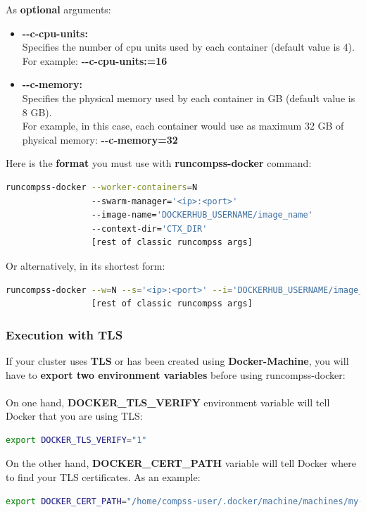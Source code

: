 As \textbf{optional} arguments:
\begin{itemize}
 \item { 
 \textbf{-{}-c-cpu-units:} \\
 Specifies the number of cpu units used by each container (default value is 4). \\
 For example: \textbf{-{}-c-cpu-units:=16}
 }
 
 \item { 
 \textbf{-{}-c-memory:} \\
 Specifies the physical memory used by each container in GB (default value is 8 GB).\\
 For example, in this case, each container would use as maximum 32 GB of physical memory: \textbf{-{}-c-memory=32}
 }
\end{itemize}

Here is the \textbf{format} you must use with \textbf{runcompss-docker} command:
\begin{lstlisting}[language=bash]
runcompss-docker --worker-containers=N
                 --swarm-manager='<ip>:<port>'
                 --image-name='DOCKERHUB_USERNAME/image_name'
                 --context-dir='CTX_DIR'
                 [rest of classic runcompss args]
\end{lstlisting}           

Or alternatively, in its shortest form:
\begin{lstlisting}[language=bash]
runcompss-docker --w=N --s='<ip>:<port>' --i='DOCKERHUB_USERNAME/image_name' --c='CTX_DIR'
                 [rest of classic runcompss args]
\end{lstlisting}        


\subsubsection{Execution with TLS}

If your cluster uses \textbf{TLS} or has been created using \textbf{Docker-Machine}, you will have to 
\textbf{export two environment variables} before using runcompss-docker:\\ \\

On one hand, \textbf{DOCKER\_TLS\_VERIFY} environment variable will tell Docker that you are using TLS:

\begin{lstlisting}[language=bash]
export DOCKER_TLS_VERIFY="1"
\end{lstlisting}
On the other hand, \textbf{DOCKER\_CERT\_PATH} variable will tell Docker where to find your TLS certificates. As an example:
\begin{lstlisting}[language=bash]
export DOCKER_CERT_PATH="/home/compss-user/.docker/machine/machines/my-manager-node"
\end{lstlisting}

